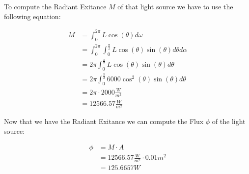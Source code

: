     To compute the Radiant Exitance $M$ of that light source we have to use
    the following equation:

    \begin{align}
      M &= \int_{0}^{2\pi}L\cos(\theta)d\omega \\
        &= \int_{0}^{2\pi}\int_0^{\frac{\pi}{2}}L\cos(\theta)\sin(\theta)d\theta{}d\alpha \\
        &= 2\pi\int_0^{\frac{\pi}{2}}L\cos(\theta)\sin(\theta)d\theta{} \\
        &= 2\pi\int_0^{\frac{\pi}{2}}6000\cos^2(\theta)\sin(\theta)d\theta{} \\
        &= 2\pi \cdot{} 2000 \frac{W}{m^2} \\
        &= 12566.57 \frac{W}{m^2}
    \end{align}

    Now that we have the Radiant Exitance we can compute the Flux $\phi$ of the light source:

    \begin{align}
      \phi  &=  M \cdot A \\
            &=  12566.57\frac{W}{m^2}\cdot 0.01 m^2 \\
            &=  125.6657 W
    \end{align}
